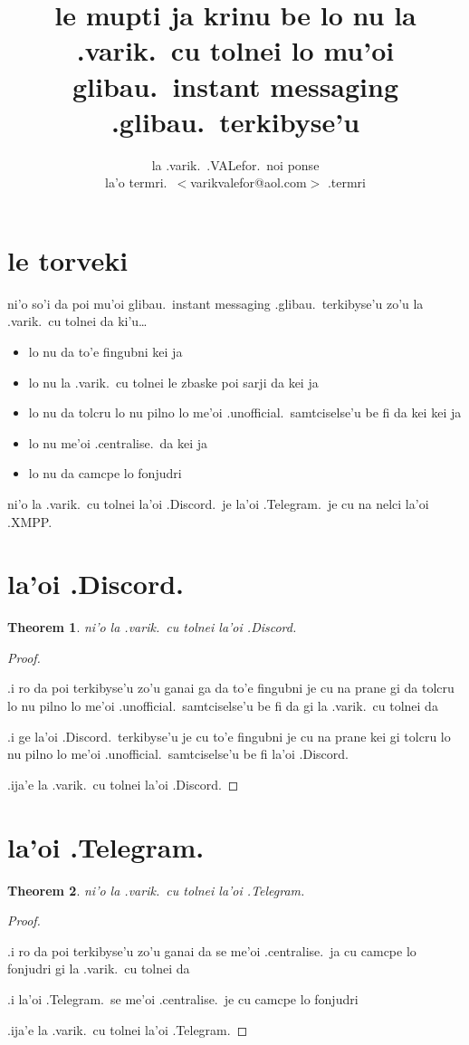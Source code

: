 \documentclass{article}
\title{le mupti ja krinu be lo nu la .varik.\ cu tolnei lo mu'oi glibau.\ instant messaging .glibau.\ terkibyse'u}
\author{la .varik.\ .VALefor.\ noi ponse\\la'o termri.\ $<$varikvalefor@aol.com$>$ .termri}
\newtheorem{thm}{Theorem}
\begin{document}
\maketitle

\section{le torveki}
ni'o so'i da poi mu'oi glibau.\ instant messaging .glibau.\ terkibyse'u zo'u la .varik.\ cu tolnei da ki'u\ldots
\begin{itemize}
	\item lo nu da to'e fingubni kei ja
	\item lo nu la .varik.\ cu tolnei le zbaske poi sarji da kei ja
	\item lo nu da tolcru lo nu pilno lo me'oi .unofficial.\ samtciselse'u be fi da kei kei ja
	\item lo nu me'oi .centralise.\ da kei ja
	\item lo nu da camcpe lo fonjudri
\end{itemize}

ni'o la .varik.\ cu tolnei la'oi .Discord.\ je la'oi .Telegram.\ je cu na nelci la'oi .XMPP.
\section{la'oi .Discord.}
\begin{thm}
	ni'o la .varik.\ cu tolnei la'oi .Discord.
\end{thm}
\begin{proof}
	${}$

	.i ro da poi terkibyse'u zo'u ganai ga da to'e fingubni je cu na prane gi da tolcru lo nu pilno lo me'oi .unofficial.\ samtciselse'u be fi da gi la .varik.\ cu tolnei da

	.i ge la'oi .Discord.\ terkibyse'u je cu to'e fingubni je cu na prane kei gi tolcru lo nu pilno lo me'oi .unofficial.\ samtciselse'u be fi la'oi .Discord.

	.ija'e la .varik.\ cu tolnei la'oi .Discord.
\end{proof}

\section{la'oi .Telegram.}
\begin{thm}
	ni'o la .varik.\ cu tolnei la'oi .Telegram.
\end{thm}
\begin{proof}
	${}$

	.i ro da poi terkibyse'u zo'u ganai da se me'oi .centralise.\ ja cu camcpe lo fonjudri gi la .varik.\ cu tolnei da

	.i la'oi .Telegram.\ se me'oi .centralise.\ je cu camcpe lo fonjudri

	.ija'e la .varik.\ cu tolnei la'oi .Telegram.
\end{proof}
\end{document}
